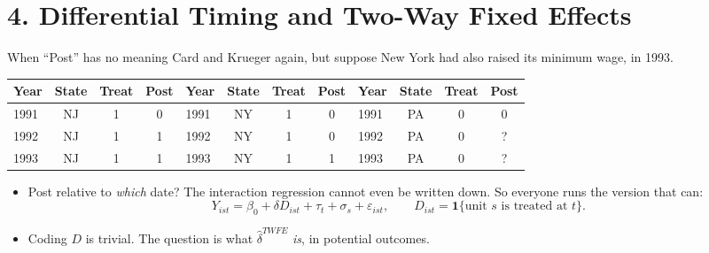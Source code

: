 \documentclass[
  11pt,
  ignorenonframetext,
  aspectratio=169,
]{beamer}
\providecommand{\tightlist}{%
  \setlength{\itemsep}{0pt}\setlength{\parskip}{0pt}}
\begin{document}
\section{4. Differential Timing and Two-Way Fixed
Effects}\label{differential-timing-and-two-way-fixed-effects}

\begin{frame}{When ``Post'' has no meaning}
\protect{}\label{when-post-has-no-meaning}
Card and Krueger again, but suppose New York had also raised its minimum
wage, in 1993.

\begin{center}\scriptsize
\begin{tabular}{lccc|lccc|lccc}
\toprule
Year & State & Treat & Post & Year & State & Treat & Post & Year & State & Treat & Post \\
\midrule
1991 & NJ & 1 & 0 & 1991 & NY & 1 & 0 & 1991 & PA & 0 & 0 \\
1992 & NJ & 1 & 1 & 1992 & NY & 1 & 0 & 1992 & PA & 0 & ? \\
1993 & NJ & 1 & 1 & 1993 & NY & 1 & 1 & 1993 & PA & 0 & ? \\
\bottomrule
\end{tabular}
\end{center}

\begin{itemize}
\tightlist
\item
  Post relative to \emph{which} date? The interaction regression cannot
  even be written down. So everyone runs the version that can: \[
  Y_{ist} = \beta_0 + \delta D_{ist} + \tau_t + \sigma_s + \varepsilon_{ist}, \qquad D_{ist} = \mathbf{1}\{\text{unit } s \text{ is treated at } t\}.
  \]
\item
  Coding \(D\) is trivial. The question is what \(\hat\delta^{TWFE}\)
  \emph{is}, in potential outcomes.
\end{itemize}
\end{frame}
\end{document}
